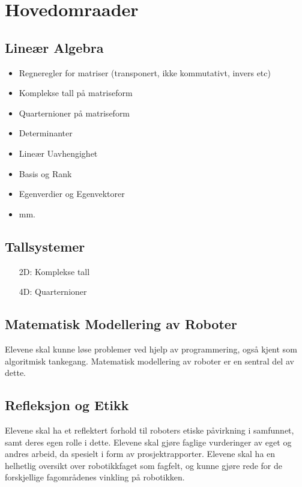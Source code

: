\section*{Hovedomraader} \label{Sec: Hovedomraader}


\subsection*{Lineær Algebra}

    \begin{itemize}
        \item Regneregler for matriser (transponert, ikke kommutativt, invers etc)
        \item Komplekse tall på matriseform
        \item Quarternioner på matriseform
        \item Determinanter
        \item Lineær Uavhengighet
        \item Basis og Rank
        \item Egenverdier og Egenvektorer
        \item mm.
    \end{itemize}


\subsection*{Tallsystemer}

    \begin{itemize}
        \item[2D:] Komplekse tall
        \item[4D:] Quarternioner
    \end{itemize}


\subsection*{Matematisk Modellering av Roboter}
    Elevene skal kunne løse problemer ved hjelp av programmering, også kjent som algoritmisk tankegang. Matematisk modellering av roboter er en sentral del av dette.


\subsection*{Refleksjon og Etikk}
    Elevene skal ha et reflektert forhold til roboters etiske påvirkning i samfunnet, samt deres egen rolle i dette.
    Elevene skal gjøre faglige vurderinger av eget og andres arbeid, da spesielt i form av prosjektrapporter.
    Elevene skal ha en helhetlig oversikt over robotikkfaget som fagfelt, og kunne gjøre rede for de forskjellige fagområdenes vinkling på robotikken.


